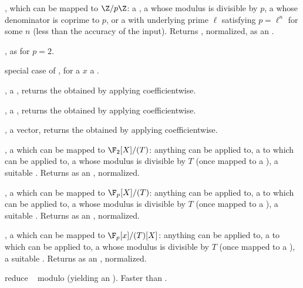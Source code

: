 

,  which can be mapped to
$\Z/p\Z$: a , a  whose modulus is divisible by $p$,
a  whose denominator is coprime to $p$, or a  with
underlying prime $\ell$ satisfying $p = \ell^n$ for some $n$ (less than the
accuracy of the input). Returns , normalized, as an
.

, as  for $p = 2$.

 special case of ,
for a $x$ a .

,  a , returns the
 obtained by applying  coefficientwise.

,  a , returns the
 obtained by applying  coefficientwise.

,  a vector, returns the
 obtained by applying  coefficientwise.

,  a  which can be
mapped to $\F_2[X]/(T)$: anything  can be applied to,
a  to which  can be applied to, a 
whose modulus is divisible by $T$ (once mapped to a ), a suitable
. Returns  as an , normalized.

,  a  which can be
mapped to $\F_p[X]/(T)$: anything  can be applied to,
a  to which  can be applied to, a 
whose modulus is divisible by $T$ (once mapped to a ), a suitable
. Returns  as an , normalized.

,  a  which can be
mapped to $\F_p[x]/(T)[X]$: anything  can be applied to,
a  to which  can be applied to, a 
whose modulus is divisible by $T$ (once mapped to a ), a suitable
. Returns  as an , normalized.

 reduce ~ modulo 
(yielding an ). Faster than .

